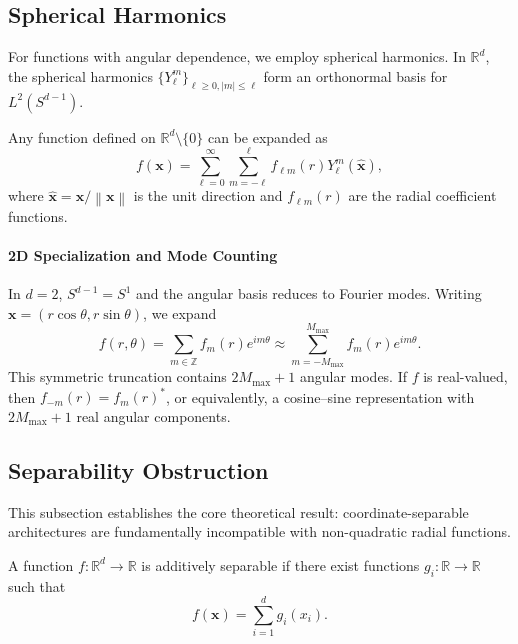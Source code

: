 \documentclass[twoside,11pt]{article}
\newcommand{\R}{\mathbb{R}}
\newcommand{\bx}{\bm{x}}
\newcommand{\norm}[1]{\left\|#1\right\|}
\begin{document}
\subsection{Spherical Harmonics}
\label{subsec:spherical_harmonics}

For functions with angular dependence, we employ spherical harmonics. In $\R^d$, the spherical harmonics $\{Y_\ell^m\}_{\ell \geq 0, |m| \leq \ell}$ form an orthonormal basis for $L^2(S^{d-1})$.

Any function defined on $\R^d \setminus \{0\}$ can be expanded as
\begin{equation}
	f(\bx) = \sum_{\ell=0}^\infty \sum_{m=-\ell}^\ell f_{\ell m}(r) Y_\ell^m(\hat{\bx}),
	\label{eq:spherical_expansion}
\end{equation}
where $\hat{\bx} = \bx/\norm{\bx}$ is the unit direction and $f_{\ell m}(r)$ are the radial coefficient functions.

\paragraph{2D Specialization and Mode Counting} In $d=2$, $S^{d-1} = S^1$ and the angular basis reduces to Fourier modes. Writing $\bx = (r\cos\theta, r\sin\theta)$, we expand
\begin{equation*}
	f(r,\theta) = \sum_{m\in\mathbb{Z}} f_m(r) e^{im\theta} \approx \sum_{m=-M_{\max}}^{M_{\max}} f_m(r) e^{im\theta}.
\end{equation*}
This symmetric truncation contains $2M_{\max}+1$ angular modes. If $f$ is real-valued, then $f_{-m}(r)=f_m(r)^\ast$, or equivalently, a cosine--sine representation with $2M_{\max}+1$ real angular components.

\subsection{Separability Obstruction}
\label{sec:obstruction}

This subsection establishes the core theoretical result: coordinate-separable architectures are fundamentally incompatible with non-quadratic radial functions.

\begin{definition}
	A function $f: \R^d \to \R$ is additively separable if there exist functions $g_i: \R \to \R$ such that
	\begin{equation}
		f(\bx) = \sum_{i=1}^d g_i(x_i).
		\label{eq:additive_separable}
	\end{equation}
\end{definition}
\end{document}
